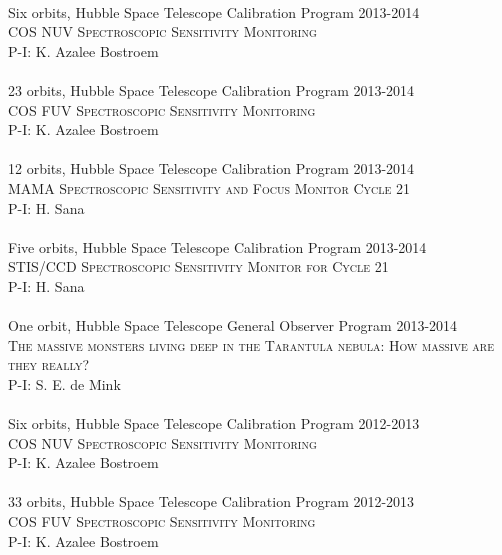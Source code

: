 \documentclass[10pt]{cv}
\begin{document}
\begin{llist}
\\
Six orbits, Hubble Space Telescope Calibration Program \hfill 2013-2014\\ %
\textsc{COS NUV Spectroscopic Sensitivity Monitoring}\\
P-I: K. Azalee Bostroem \\ %
\\
23 orbits, Hubble Space Telescope Calibration Program \hfill 2013-2014\\ %
\textsc{COS FUV Spectroscopic Sensitivity Monitoring}\\
P-I: K. Azalee Bostroem \\ %
\\
12 orbits, Hubble Space Telescope Calibration Program \hfill  2013-2014\\ %
\textsc{MAMA Spectroscopic Sensitivity and Focus Monitor Cycle 21}\\ 
P-I: H. Sana \\ %
\\
Five orbits, Hubble Space Telescope Calibration Program \hfill  2013-2014\\ %
\textsc{STIS/CCD Spectroscopic Sensitivity Monitor for Cycle 21} \\
P-I: H. Sana\\ %
\\
One orbit, Hubble Space Telescope General Observer Program \hfill  2013-2014\\ %
\textsc{The massive monsters living deep in the Tarantula nebula: How massive are they really?} \\
P-I: S. E. de Mink\\ %
\\
Six orbits, Hubble Space Telescope Calibration Program \hfill 2012-2013\\ %
\textsc{COS NUV Spectroscopic Sensitivity Monitoring}\\
P-I: K. Azalee Bostroem \\ %
\\
33 orbits, Hubble Space Telescope Calibration Program \hfill 2012-2013\\ %
\textsc{COS FUV Spectroscopic Sensitivity Monitoring}\\
P-I: K. Azalee Bostroem \\ %

\end{llist}
\end{document}
